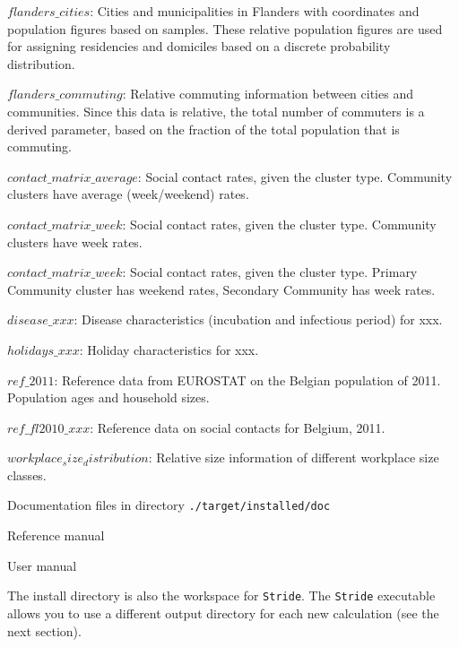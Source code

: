 \begin{compactitem}
\begin{compactitem}
        	\item $flanders\_cities$: Cities and municipalities in Flanders with coordinates and population figures based on samples. These relative population figures are used for assigning residencies and domiciles based on a discrete probability distribution.
        	\item $flanders\_commuting$: Relative commuting information between cities and communities. Since this data is relative, the total number of commuters is a derived parameter, based on the fraction of the total population that is commuting.
			\item $contact\_matrix\_average$: Social contact rates, given the cluster type. Community clusters have average (week/weekend) rates.
			\item $contact\_matrix\_week$: Social contact rates, given the cluster type. Community clusters have week rates.
			\item $contact\_matrix\_week$: Social contact rates, given the cluster type. Primary Community cluster has weekend rates, Secondary Community has week rates.
			\item $disease\_xxx$: Disease characteristics (incubation and infectious period) for xxx.
			\item $holidays\_xxx$: Holiday characteristics for xxx.
			\item $ref\_2011$: Reference data from EUROSTAT on the Belgian population of 2011. Population ages and household sizes.
			\item $ref\_fl2010\_xxx$: Reference data on social contacts for Belgium, 2011.
			\item $workplace_size_distribution$: Relative size information of different workplace size classes. 
        \end{compactitem}
%
    \item Documentation files in directory \texttt{./target/installed/doc}
      	\begin{compactitem}
        			\item Reference manual
        			\item User manual
        \end{compactitem}
%
\end{compactitem}

The install directory is also the workspace for \texttt{Stride}. The \texttt{Stride} executable allows you to use a different output directory for each new calculation (see the next section).

\newpage
